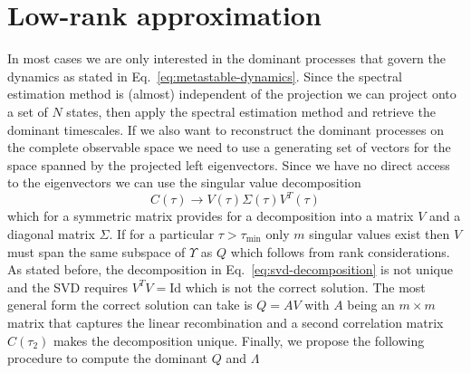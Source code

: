 \documentclass[aps,pre,twocolumn,nofootinbib,superscriptaddress,linenumbers]{revtex4-1}
\begin{document}

\section{Low-rank approximation}
\label{section:lowrankapproximation}

In most cases we are only interested in the dominant processes that
govern the dynamics as stated in Eq.~\ref{eq:metastable-dynamics}.
Since the spectral estimation method is (almost) independent of the
projection we can project onto a set of $N$ states, then apply the
spectral estimation method and retrieve the dominant timescales. If
we also want to reconstruct the dominant processes on the complete
observable space we need to use a generating set of vectors for the
space spanned by the projected left eigenvectors. Since we have no
direct access to the eigenvectors we can use the singular value decomposition
\begin{equation}
C(\tau)\rightarrow V(\tau)\Sigma(\tau)V^{T}(\tau)\label{eq:svd-decomposition}
\end{equation}
which for a symmetric matrix provides for a decomposition into a matrix
$V$ and a diagonal matrix $\Sigma$. If for a particular $\tau>\tau_{\text{min}}$
only $m$ singular values exist then $V$ must span the same subspace
of $\Upsilon$ as $Q$ which follows from rank considerations. As
stated before, the decomposition in Eq.~\ref{eq:svd-decomposition}
is not unique and the SVD requires $V^{T}V=\text{Id}$ which is not
the correct solution. The most general form the correct solution can
take is $Q=AV$ with $A$ being an $m\times m$ matrix that captures
the linear recombination and a second correlation matrix $C(\tau_{2})$
makes the decomposition unique. Finally, we propose the following
procedure to compute the dominant $Q$ and $\Lambda$
\end{document}
